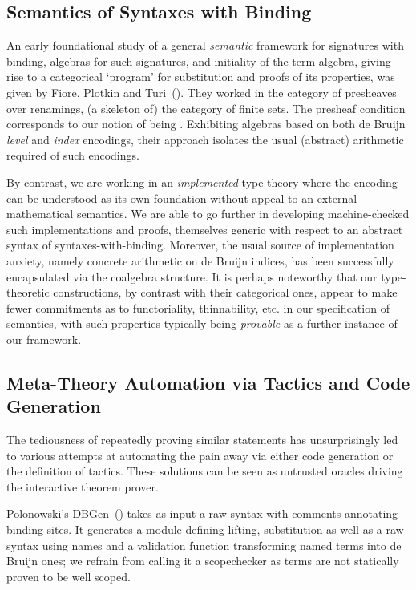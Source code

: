 \subsection{Semantics of Syntaxes with Binding} An early foundational study
of a general \emph{semantic} framework for signatures with binding, algebras
for such signatures, and initiality of the term algebra, giving rise to a
categorical `program' for substitution and proofs of its properties, was given
by Fiore, Plotkin and Turi~(\citeyear{FiorePlotkinTuri99}).%
They worked in the category of presheaves
over renamings, (a skeleton of) the category of finite sets. The presheaf
condition corresponds to our notion of being . Exhibiting
algebras based on both de Bruijn \emph{level} and \emph{index} encodings,
their approach isolates the usual (abstract) arithmetic required of such
encodings.

By contrast, we are working in an \emph{implemented} type theory where the
encoding can be understood as its own foundation without appeal to an external
mathematical semantics. We are able to go further in developing machine-checked
such implementations and proofs, themselves generic with respect to an abstract syntax
 of syntaxes-with-binding. Moreover, the usual source of implementation
anxiety, namely concrete arithmetic on de Bruijn indices, has been successfully
encapsulated via the  coalgebra structure. It is perhaps noteworthy that
our type-theoretic constructions, by contrast with their categorical ones,
appear to make fewer commitments as to functoriality, thinnability, etc. in our
specification of semantics, with such properties typically being \emph{provable}
as a further instance of our framework.

\subsection{Meta-Theory Automation via Tactics and Code Generation} The
tediousness of repeatedly
proving similar statements has unsurprisingly led to various attempts at
automating the pain away via either code generation or the definition of
tactics. These solutions can be seen as untrusted oracles driving the
interactive theorem prover.

Polonowski's DBGen~(\citeyear{polonowski:db}) takes as input a raw syntax with
comments annotating binding sites. It generates a module defining lifting,
substitution as well as a raw syntax using names and a validation function
transforming named terms into de Bruijn ones; we refrain from calling it a
scopechecker as terms are not statically proven to be well scoped.


